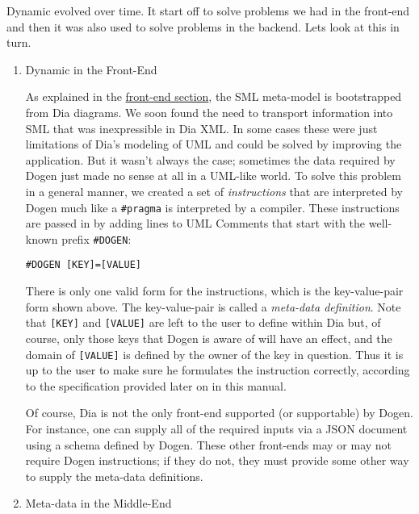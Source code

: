 \documentclass[11pt]{article}
\begin{document}
\begin{enumerate}
\begin{enumerate}
\begin{enumerate}
Dynamic evolved over time. It start off to solve problems we had in
the front-end and then it was also used to solve problems in the
backend. Lets look at this in turn.

\begin{enumerate}
\item Dynamic in the Front-End
\label{sec-2-2-1-2-4-1-1}

As explained in the \href{https://github.com/DomainDrivenConsulting/dogen/blob/master/doc/manual/manual.org#the-front-end}{front-end section}, the SML meta-model is
bootstrapped from Dia diagrams. We soon found the need to transport
information into SML that was inexpressible in Dia XML. In some cases
these were just limitations of Dia's modeling of UML and could be
solved by improving the application. But it wasn't always the case;
sometimes the data required by Dogen just made no sense at all in a
UML-like world. To solve this problem in a general manner, we created
a set of \emph{instructions} that are interpreted by Dogen much like a
\texttt{\#pragma} is interpreted by a compiler. These instructions are passed
in by adding lines to UML Comments that start with the well-known
prefix \texttt{\#DOGEN}:

\begin{verbatim}
#DOGEN [KEY]=[VALUE]
\end{verbatim}

There is only one valid form for the instructions, which is the
key-value-pair form shown above. The key-value-pair is called a
\emph{meta-data definition}. Note that \texttt{[KEY]} and \texttt{[VALUE]} are left to
the user to define within Dia but, of course, only those keys that
Dogen is aware of will have an effect, and the domain of \texttt{[VALUE]} is
defined by the owner of the key in question. Thus it is up to the user
to make sure he formulates the instruction correctly, according to the
specification provided later on in this manual.

Of course, Dia is not the only front-end supported (or supportable) by
Dogen. For instance, one can supply all of the required inputs via a
JSON document using a schema defined by Dogen. These other front-ends
may or may not require Dogen instructions; if they do not, they must
provide some other way to supply the meta-data definitions.

\item Meta-data in the Middle-End
\label{sec-2-2-1-2-4-1-2}


\end{enumerate}
\end{enumerate}
\end{enumerate}
\end{enumerate}
\end{document}
